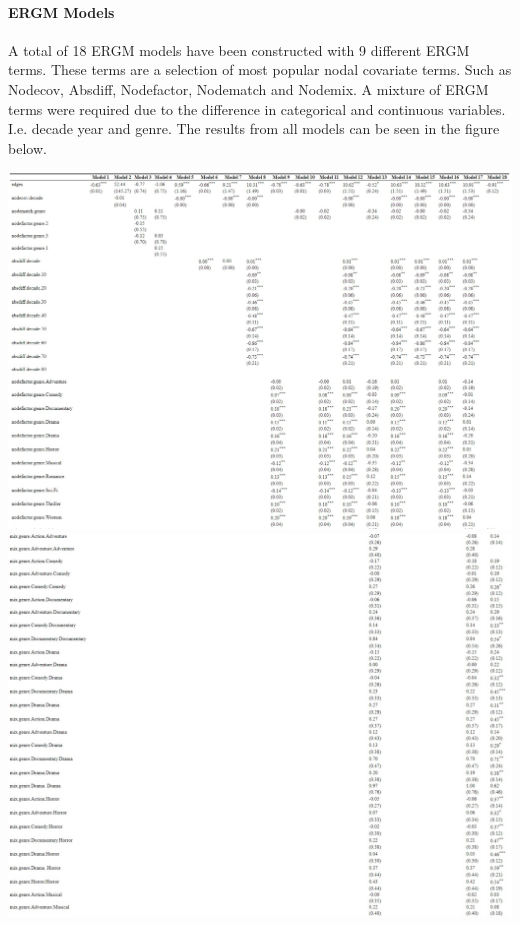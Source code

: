 \documentclass[
  english,
  man,floatsintext]{apa6}
\let\oldparagraph\paragraph
\renewcommand{\paragraph}[1]{\oldparagraph{#1}\mbox{}}
\begin{document}
\hypertarget{ergm-models}{%
\paragraph{ERGM Models}\label{ergm-models}}

A total of 18 ERGM models have been constructed with 9 different ERGM terms. These terms are a selection of most popular nodal covariate terms. Such as Nodecov, Absdiff, Nodefactor, Nodematch and Nodemix. A mixture of ERGM terms were required due to the difference in categorical and continuous variables. I.e. decade year and genre. The results from all models can be seen in the figure below.

\includegraphics{ergm_result/model_result1.jpeg}
\includegraphics{ergm_result/model_result2.jpeg}
\end{document}
